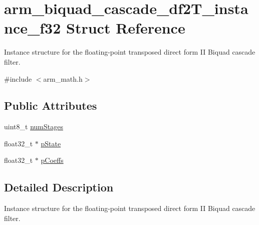 \hypertarget{structarm__biquad__cascade__df2_t__instance__f32}{\section{arm\-\_\-biquad\-\_\-cascade\-\_\-df2\-T\-\_\-instance\-\_\-f32 Struct Reference}
\label{structarm__biquad__cascade__df2_t__instance__f32}
}


Instance structure for the floating-\/point transposed direct form I\-I Biquad cascade filter.  




{\ttfamily \#include $<$arm\-\_\-math.\-h$>$}

\subsection*{Public Attributes}
\begin{DoxyCompactItemize}
\item 
uint8\-\_\-t \hyperlink{structarm__biquad__cascade__df2_t__instance__f32_a4d17958c33c3d0a905f974bac50f033f}{num\-Stages}
\item 
float32\-\_\-t $\ast$ \hyperlink{structarm__biquad__cascade__df2_t__instance__f32_a24d223addfd926a7177088cf2efe76b1}{p\-State}
\item 
float32\-\_\-t $\ast$ \hyperlink{structarm__biquad__cascade__df2_t__instance__f32_a49a24fe1b6ad3b0b26779c32d8d80b2e}{p\-Coeffs}
\end{DoxyCompactItemize}


\subsection{Detailed Description}
Instance structure for the floating-\/point transposed direct form I\-I Biquad cascade filter. 

